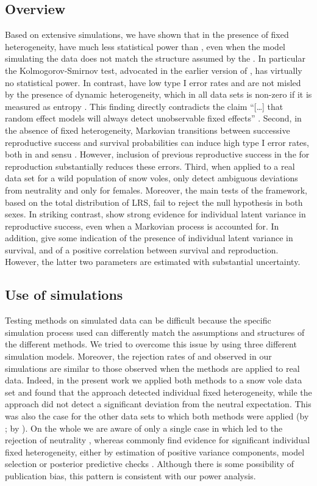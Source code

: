 \subsection{Overview}
Based on extensive simulations, we have shown that in the presence of fixed heterogeneity, \NSM have much less statistical power than \MM, even when the model simulating the data does not match the structure assumed by the \MM. In particular the Kolmogorov-Smirnov test, advocated in the earlier version of \NSM, has virtually no statistical power. In contrast, \MM have low type I error rates and are not misled by the presence of dynamic heterogeneity, which in all data sets is non-zero if it is measured as entropy \parencite{Tuljapurkar2009}. This finding directly contradicts the claim ``[\dots] that random effect models will always detect unobservable fixed effects'' \cite{Steiner2010}.
Second, in the absence of fixed heterogeneity, Markovian transitions between successive reproductive success and survival probabilities can induce high type I error rates, both in \MM and \NSM sensu \cite{Plard2012}. However, inclusion of previous reproductive success in the \MM for reproduction substantially reduces these errors.
Third, when applied to a real data set for a wild population of snow voles, \NSM only detect ambiguous deviations from neutrality and only for females. Moreover, the main tests of the framework, based on the total distribution of LRS, fail to reject the null hypothesis in both sexes. In striking contrast, \MM show strong evidence for individual latent variance in reproductive success, even when a Markovian process is accounted for. In addition, \MM give some indication of the presence of individual latent variance in survival, and of a positive correlation between survival and reproduction. However, the latter two parameters are estimated with substantial uncertainty.

\subsection{Use of simulations}
Testing methods on simulated data can be difficult because the specific simulation process used can differently match the assumptions and structures of the different methods. We tried to overcome this issue by using three different simulation models. 
Moreover, the rejection rates of \MM and \NSM observed in our simulations are similar to those observed when the methods are applied to real data. Indeed, in the present work we applied both methods to a snow vole data set and found that the \MM approach detected individual fixed heterogeneity, while the \NSM approach did not detect a significant deviation from the neutral expectation. This was also the case for the other data sets to which both methods were applied (\MM by \cite{Cam2013}; \NSM by \cite{Steiner2010}). On the whole we are aware of only a single case in which \NSM led to the rejection of neutrality  \parencite{Plard2012}, whereas \MM commonly find evidence for significant individual fixed heterogeneity, either by estimation of positive variance components, model selection \parencite{Cam2013} or posterior predictive checks \parencite{Chambert2014}. Although there is some possibility of publication bias, this pattern is consistent with our power analysis.

